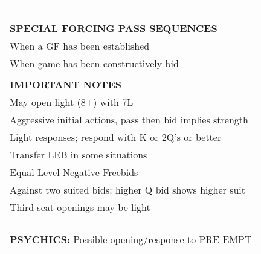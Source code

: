\documentclass{article}
\begin{document}
\begin{minipage}{90mm}
\begin{tabular}{| p{88mm} |}
		\\ \hline
		\\ \hline
		\\ \hline
		\\ \hline
		\\ \hline
		\\ \hline
		\cellcolor{orange!25}\textbf{SPECIAL FORCING PASS SEQUENCES} \\ \hline
		When a GF has been established\\ \hline
		When game has been constructively bid\\ \hline
		\\ \hline
		\cellcolor{orange!25}\textbf{IMPORTANT NOTES} \\ \hline
		May open light (8+) with 7L\\ \hline
		Aggressive initial actions, pass then bid implies strength\\ \hline
		Light responses; respond with K or 2Q's or better \\ \hline
		Transfer LEB in some situations\\ \hline
		Equal Level Negative Freebids\\ \hline
		Against two suited bids: higher Q bid shows higher suit \\ \hline
		Third seat openings may be light\\ \hline
		\\ \hline
		\\ \hline
		\\ \hline
		\\ \hline
		\cellcolor{orange!25}\textbf{PSYCHICS:} Possible opening/response to PRE-EMPT\\ \hline
	\end{tabular}
\end{minipage}
\end{document}
